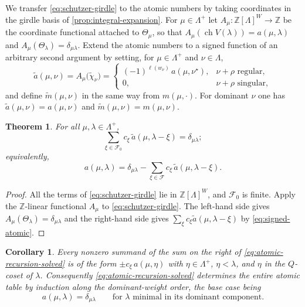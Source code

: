 \documentclass[11pt]{article}
\newtheorem{theorem}{Theorem}[section]
\newtheorem{corollary}[corollary]{Corollary}
\theoremstyle{definition}
\theoremstyle{remark}
\newcommand{\RaizReti}{Q}
\newcommand{\Pesos}{\Lambda}
\newcommand{\Weyl}{W}
\newcommand{\chr}{\operatorname{ch}}
\newcommand{\Z}{\mathbb Z}
\begin{document}
We transfer \eqref{eq:schutzer-girdle} to the atomic numbers by taking
coordinates in the girdle basis of \cref{prop:integral-expansion}.  For
$\mu\in\Pesos^+$ let $A_\mu:\Z[\Pesos]^\Weyl\to\Z$ be the coordinate
functional attached to $\Theta_\mu$, so that
$A_\mu(\chr V(\lambda))=a(\mu,\lambda)$ and
$A_\mu(\Theta_\lambda)=\delta_{\mu\lambda}$.  Extend the atomic numbers to a
signed function of an arbitrary second argument by setting, for
$\mu\in\Pesos^+$ and $\nu\in\Pesos$,
\begin{equation}\label{eq:signed-atomic}
   \widetilde a(\mu,\nu)=A_\mu\bigl(\widetilde\chi_\nu\bigr)
      =\begin{cases}
        (-1)^{\ell(w_\nu)}\,a(\mu,\nu^\star),&\nu+\rho\text{ regular},\\[1mm]
        0,&\nu+\rho\text{ singular},
      \end{cases}
\end{equation}
and define $\widetilde m(\mu,\nu)$ in the same way from
$m(\mu,\cdot)$.  For dominant $\nu$ one has
$\widetilde a(\mu,\nu)=a(\mu,\nu)$ and $\widetilde m(\mu,\nu)=m(\mu,\nu)$.

\begin{theorem}\label{thm:atomic-recursion}
For all $\mu,\lambda\in\Pesos^+$,
\begin{equation}\label{eq:atomic-recursion}
   \sum_{\xi\in\mathcal F_0}c_\xi\,\widetilde a(\mu,\lambda-\xi)
      =\delta_{\mu\lambda};
\end{equation}
equivalently,
\begin{equation}\label{eq:atomic-recursion-solved}
   a(\mu,\lambda)
     =\delta_{\mu\lambda}
       -\sum_{\xi\in\mathcal F}c_\xi\,\widetilde a(\mu,\lambda-\xi).
\end{equation}
\end{theorem}

\begin{proof}
All the terms of \eqref{eq:schutzer-girdle} lie in $\Z[\Pesos]^\Weyl$, and
$\mathcal F_0$ is finite.  Apply the $\Z$-linear functional $A_\mu$ to
\eqref{eq:schutzer-girdle}.  The left-hand side
gives $A_\mu(\Theta_\lambda)=\delta_{\mu\lambda}$ and the right-hand side
gives $\sum_\xi c_\xi\widetilde a(\mu,\lambda-\xi)$ by
\eqref{eq:signed-atomic}.
\end{proof}

\begin{corollary}\label{cor:atomic-recursion-effective}
Every nonzero summand of the sum on the right of
\eqref{eq:atomic-recursion-solved} is of the form $\pm c_\xi\,a(\mu,\eta)$
with $\eta\in\Pesos^+$, $\eta<\lambda$, and $\eta$ in the $\RaizReti$-coset of
$\lambda$.  Consequently
\eqref{eq:atomic-recursion-solved} determines the entire atomic table by
induction along the dominant-weight order, the base case being
\[
   a(\mu,\lambda)=\delta_{\mu\lambda}
   \qquad\text{for }\lambda\text{ minimal in its dominant component.}
\]
\end{corollary}
\end{document}
